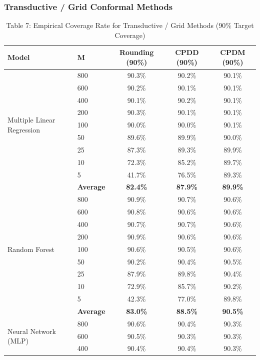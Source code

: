 \documentclass[11pt,a4paper]{article}
\begin{document}
\subsubsection{Transductive / Grid Conformal Methods}

\begin{table}[H]
\centering
\caption{Table 7: Empirical Coverage Rate for Transductive / Grid Methods (90\% Target Coverage)}
\label{tab:team_tab7}
\scriptsize
\begin{tabular}{llccc}
\toprule
Model & M & Rounding (90\%) & CPDD (90\%) & CPDM (90\%) \\
\midrule
\multirow{9}{*}{Multiple Linear Regression}
 & 800 & 90.3\% & 90.2\% & 90.1\% \\
 & 600 & 90.2\% & 90.1\% & 90.1\% \\
 & 400 & 90.1\% & 90.2\% & 90.1\% \\
 & 200 & 90.3\% & 90.1\% & 90.1\% \\
 & 100 & 90.0\% & 90.0\% & 90.1\% \\
 & 50  & 89.6\% & 89.9\% & 90.0\% \\
 & 25  & 87.3\% & 89.3\% & 89.9\% \\
 & 10  & 72.3\% & 85.2\% & 89.7\% \\
 & 5   & 41.7\% & 76.5\% & 89.3\% \\
 & \textbf{Average} & \textbf{82.4\%} & \textbf{87.9\%} & \textbf{89.9\%} \\
\midrule
\multirow{9}{*}{Random Forest}
 & 800 & 90.9\% & 90.7\% & 90.6\% \\
 & 600 & 90.8\% & 90.6\% & 90.6\% \\
 & 400 & 90.7\% & 90.7\% & 90.6\% \\
 & 200 & 90.9\% & 90.6\% & 90.6\% \\
 & 100 & 90.6\% & 90.5\% & 90.6\% \\
 & 50  & 90.2\% & 90.4\% & 90.5\% \\
 & 25  & 87.9\% & 89.8\% & 90.4\% \\
 & 10  & 72.9\% & 85.7\% & 90.2\% \\
 & 5   & 42.3\% & 77.0\% & 89.8\% \\
 & \textbf{Average} & \textbf{83.0\%} & \textbf{88.5\%} & \textbf{90.5\%} \\
\midrule
\multirow{9}{*}{Neural Network (MLP)}
 & 800 & 90.6\% & 90.4\% & 90.3\% \\
 & 600 & 90.5\% & 90.3\% & 90.3\% \\
 & 400 & 90.4\% & 90.4\% & 90.3\% \\

\end{tabular}
\end{table}
\end{document}
